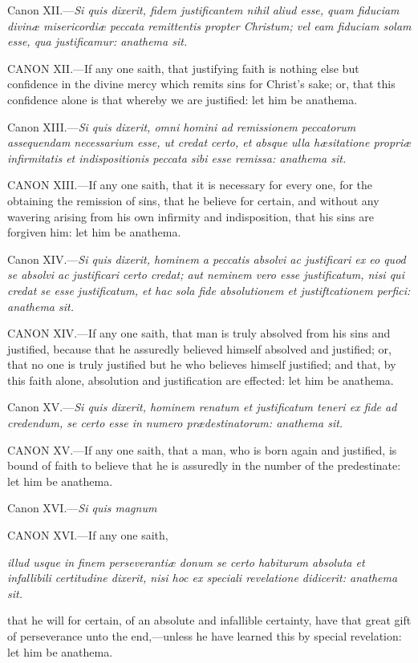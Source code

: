 Canon XII.—\emph{Si quis dixerit, fidem justificantem nihil aliud esse, quam fiduciam divinæ misericordiæ peccata remittentis propter Christum; vel eam fiduciam solam esse, qua justificamur: anathema sit.}

CANON XII.—If any one saith, that justifying faith is nothing else but confidence in the divine mercy which remits sins for Christ's sake; or, that this confidence alone is that whereby we are justified: let him be anathema.

Canon XIII.—\emph{Si quis dixerit, omni homini ad remissionem peccatorum assequendam necessarium esse, ut credat certo, et absque ulla hæsitatione propriæ infirmitatis et indispositionis peccata sibi esse remissa: anathema sit.}

CANON XIII.—If any one saith, that it is necessary for every one, for the obtaining the remission of sins, that he believe for certain, and without any wavering arising from his own infirmity and indisposition, that his sins are forgiven him: let him be anathema.

Canon XIV.—\emph{Si quis dixerit, hominem a peccatis absolvi ac justificari ex eo quod se absolvi ac justificari certo credat; aut neminem vero esse justificatum, nisi qui credat se esse justificatum, et hac sola fide absolutionem et justiftcationem perfici: anathema sit.}

CANON XIV.—If any one saith, that man is truly absolved from his sins and justified, because that he assuredly believed himself absolved and justified; or, that no one is truly justified but he who believes himself justified; and that, by this faith alone, absolution and justification are effected: let him be anathema.

Canon XV.—\emph{Si quis dixerit, hominem renatum et justificatum teneri ex fide ad credendum, se certo esse in numero prædestinatorum: anathema sit.}

CANON XV.—If any one saith, that a man, who is born again and justified, is bound of faith to believe that he is assuredly in the number of the predestinate: let him be anathema.

Canon XVI.—\emph{Si quis magnum}

CANON XVI.—If any one saith,

\emph{illud usque in finem perseverantiæ donum se certo habiturum absoluta et infallibili certitudine dixerit, nisi hoc ex speciali revelatione didicerit: anathema sit.}

that he will for certain, of an absolute and infallible certainty, have that great gift of perseverance unto the end,—unless he have learned this by special revelation: let him be anathema.

